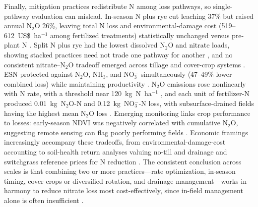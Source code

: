Finally, mitigation practices redistribute N among loss pathways, so single-pathway evaluation can mislead. In-season N plus rye cut leaching 37\% but raised annual N$_2$O 26\%, leaving total N loss and environmental-damage cost (519--612~US\$~ha$^{-1}$ among fertilized treatments) statistically unchanged versus pre-plant N \parencite{PrezaFontes2023}. Split N plus rye had the lowest dissolved N$_2$O and nitrate loads, showing stacked practices need not trade one pathway for another \parencite{Oliveira2025}, and no consistent nitrate--N$_2$O tradeoff emerged across tillage and cover-crop systems \parencite{OBrien2022}. ESN protected against N$_2$O, NH$_3$, and NO$_3^-$ simultaneously (47--49\% lower combined loss) while maintaining productivity \parencite{Menegaz2025}. N$_2$O emissions rose nonlinearly with N rate, with a threshold near 120~kg~N~ha$^{-1}$ \parencite{Wang2016b}, and each unit of fertilizer-N produced 0.01~kg~N$_2$O-N and 0.12~kg~NO$_3^-$-N loss, with subsurface-drained fields having the highest mean N$_2$O loss \parencite{Chatterjee2020b}. Emerging monitoring links crop performance to losses: early-season NDVI was negatively correlated with cumulative N$_2$O, suggesting remote sensing can flag poorly performing fields \parencite{Fontes2019}. Economic framings increasingly accompany these tradeoffs, from environmental-damage-cost accounting \parencite{PrezaFontes2023} to soil-health return analyses valuing no-till and drainage \parencite{Cassman2025} and switchgrass reference prices for N reduction \parencite{Woodbury2018}. The consistent conclusion across scales is that combining two or more practices---rate optimization, in-season timing, cover crops or diversified rotation, and drainage management---works in harmony to reduce nitrate loss most cost-effectively, since in-field management alone is often insufficient \parencite{Dinnes2002,Singh2023}.